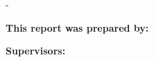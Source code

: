 \begin{titlingpage}

	\cleardoublepage
	\thispagestyle{empty}
	\calccentering{\unitlength}
	\begin{adjustwidth*}{\unitlength}{-\unitlength}
		\textbf{\ThTitleEN}

		\noindent\textbf{This report was prepared by:}\\
		\ThAuthors


		\noindent\textbf{Supervisors:}\\
		\ThSupervisors


		\noindent\ThDepartment




\end{adjustwidth*}
\end{titlingpage}

